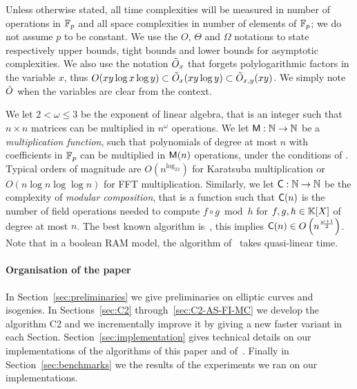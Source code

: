 Unless otherwise stated, all time complexities will be measured in
number of operations in $\mathbb{F}_p$ and all space complexities in number of
elements of $\mathbb{F}_p$; we do not assume $p$ to be constant. We use the
$O$, $\Theta$ and $\Omega$ notations to state respectively upper
bounds, tight bounds and lower bounds for asymptotic complexities. We
also use the notation $\tilde{O}_x$ that forgets polylogarithmic factors
in the variable $x$, thus $O(xy\log x \log y)\subset\tilde{O}_x(xy\log
y)\subset\tilde{O}_{x,y}(xy)$. We simply note $\tilde{O}$ when the variables
are clear from the context.

We let $2<\omega\le3$ be the exponent of linear algebra, that is an
integer such that $n\times n$ matrices can be multiplied in $n^\omega$
operations. We let $\mathrm{\sf M}:\mathbb{N}\rightarrow\mathbb{N}$ be a \emph{multiplication
  function}, such that polynomials of degree at most $n$ with
coefficients in $\mathbb{F}_p$ can be multiplied in $\mathrm{\sf M}(n)$ operations,
under the conditions of \cite[Ch. 8.3]{vzGG}. Typical orders of
magnitude are $O(n^{\log_23})$ for Karatsuba multiplication or
$O(n\log n\log\log n)$ for FFT multiplication. Similarly, we let
$\mathrm{\sf C}:\mathbb{N}\rightarrow\mathbb{N}$ be the complexity of \emph{modular
  composition}, that is a function such that $\mathrm{\sf C}(n)$ is the
number of field operations needed to compute $f\circ g\bmod h$ for
$f,g,h\in\mathbb{K}[X]$ of degree at most $n$. The best known algorithm
is~\cite{BrKu78}, this implies $\mathrm{\sf C}(n)\in
O\left(n^{\frac{\omega+1}{2}}\right)$. Note that in a boolean RAM
model, the algorithm of~\cite{KeUm08} takes quasi-linear time.

\paragraph{Organisation of the paper}
In Section~\ref{sec:preliminaries} we give preliminaries on elliptic
curves and isogenies. In Sections~\ref{sec:C2}
through~\ref{sec:C2-AS-FI-MC} we develop the algorithm C2 and we
incrementally improve it by giving a new faster variant in each
Section. Section~\ref{sec:implementation} gives technical details on
our implementations of the algorithms of this paper and
of~\cite{LeSi09}. Finally in Section~\ref{sec:benchmarks} we the
results of the experiments we ran on our implementations.



%
